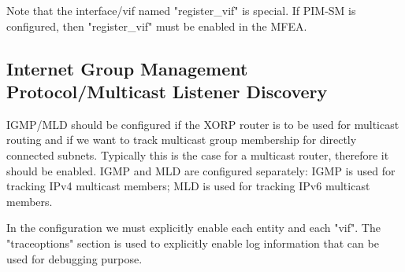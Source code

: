 \documentclass[11pt]{article}
\begin{document}
Note that the interface/vif named "register\_vif" is special.
If PIM-SM is configured, then "register\_vif" must be enabled
in the MFEA.

\subsection{Internet Group Management Protocol/Multicast Listener Discovery}

IGMP/MLD should be configured if the XORP router is to be used for multicast
routing and if we want to track multicast group membership for directly
connected subnets. Typically this is the case for a multicast router,
therefore it should be enabled. IGMP and MLD are configured separately:
IGMP is used for tracking IPv4 multicast members; MLD is used for tracking
IPv6 multicast members.

In the configuration we must explicitly enable each entity and
each "vif". The "traceoptions" section is used to explicitly enable
log information that can be used for debugging purpose.

\vspace{0.1in}
\noindent{}
\vspace{0.1in}
\end{document}
